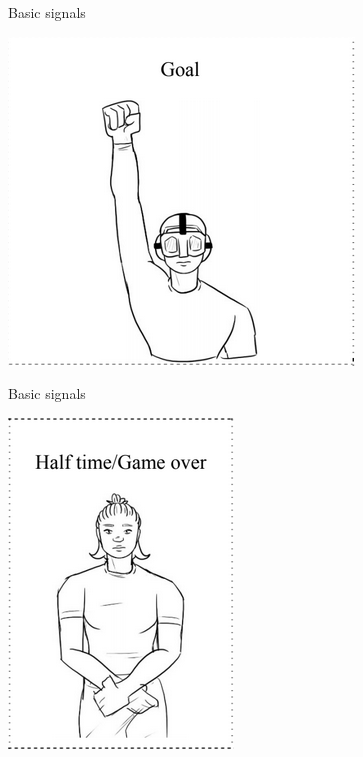 \documentclass{beamer}
\begin{document}
    \begin{frame}{Basic signals}
        \begin{center}
            \includegraphics[scale=0.8]{goalScoredSignal}
        \end{center}
    \end{frame}

    \begin{frame}{Basic signals}
        \begin{center}
            \includegraphics[scale=0.8]{endOfPeriodSignal}
        \end{center}
    \end{frame}
\end{document}
